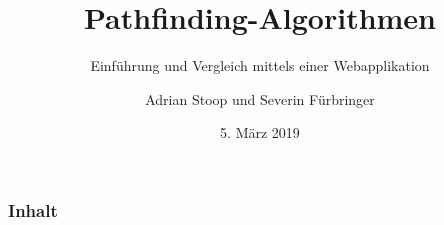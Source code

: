 \documentclass[professionalfont,serif,german]{beamer}
\title[Pathfinder-Vergleicher]{Pathfinding-Algorithmen}
\subtitle{Einführung und Vergleich mittels einer Webapplikation}
\author[A. Stoop, S. Fürbringer]{Adrian Stoop und Severin Fürbringer}
\institute[BMZ, EVT18a]{Berufsmaturitätsschule Zürich \\ \tiny{Technik,
Architektur, Life Sciences}}
\date{5. März 2019}
\begin{document}
\frame{\titlepage}


\begin{frame}
  \frametitle{Inhalt}
  \tableofcontents
\end{frame}


% 
% 
% 
% 
% 
% 
%
%
%       
% 
\end{document}
